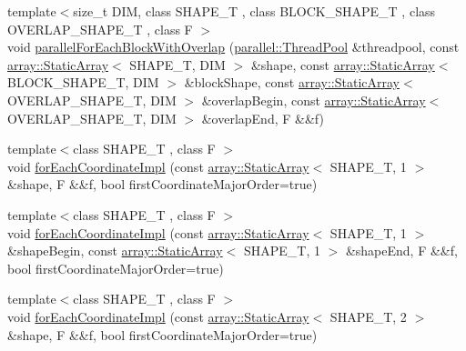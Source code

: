 \begin{DoxyCompactItemize}
\item 
{\footnotesize template$<$size\+\_\+t D\+I\+M, class S\+H\+A\+P\+E\+\_\+\+T , class B\+L\+O\+C\+K\+\_\+\+S\+H\+A\+P\+E\+\_\+\+T , class O\+V\+E\+R\+L\+A\+P\+\_\+\+S\+H\+A\+P\+E\+\_\+\+T , class F $>$ }\\void \hyperlink{namespacenifty_1_1tools_af942eef6747790a4f8d6868b1f95c3ee}{parallel\+For\+Each\+Block\+With\+Overlap} (\hyperlink{classnifty_1_1parallel_1_1ThreadPool}{parallel\+::\+Thread\+Pool} \&threadpool, const \hyperlink{namespacenifty_1_1array_a683f151f19c851754e0c6d55ed16a0c2}{array\+::\+Static\+Array}$<$ S\+H\+A\+P\+E\+\_\+\+T, D\+I\+M $>$ \&shape, const \hyperlink{namespacenifty_1_1array_a683f151f19c851754e0c6d55ed16a0c2}{array\+::\+Static\+Array}$<$ B\+L\+O\+C\+K\+\_\+\+S\+H\+A\+P\+E\+\_\+\+T, D\+I\+M $>$ \&block\+Shape, const \hyperlink{namespacenifty_1_1array_a683f151f19c851754e0c6d55ed16a0c2}{array\+::\+Static\+Array}$<$ O\+V\+E\+R\+L\+A\+P\+\_\+\+S\+H\+A\+P\+E\+\_\+\+T, D\+I\+M $>$ \&overlap\+Begin, const \hyperlink{namespacenifty_1_1array_a683f151f19c851754e0c6d55ed16a0c2}{array\+::\+Static\+Array}$<$ O\+V\+E\+R\+L\+A\+P\+\_\+\+S\+H\+A\+P\+E\+\_\+\+T, D\+I\+M $>$ \&overlap\+End, F \&\&f)
\item 
{\footnotesize template$<$class S\+H\+A\+P\+E\+\_\+\+T , class F $>$ }\\void \hyperlink{namespacenifty_1_1tools_a2f0a7c111de3217482567849aecac6b6}{for\+Each\+Coordinate\+Impl} (const \hyperlink{namespacenifty_1_1array_a683f151f19c851754e0c6d55ed16a0c2}{array\+::\+Static\+Array}$<$ S\+H\+A\+P\+E\+\_\+\+T, 1 $>$ \&shape, F \&\&f, bool first\+Coordinate\+Major\+Order=true)
\item 
{\footnotesize template$<$class S\+H\+A\+P\+E\+\_\+\+T , class F $>$ }\\void \hyperlink{namespacenifty_1_1tools_ade4cdd4e464112baf195beda9d662a96}{for\+Each\+Coordinate\+Impl} (const \hyperlink{namespacenifty_1_1array_a683f151f19c851754e0c6d55ed16a0c2}{array\+::\+Static\+Array}$<$ S\+H\+A\+P\+E\+\_\+\+T, 1 $>$ \&shape\+Begin, const \hyperlink{namespacenifty_1_1array_a683f151f19c851754e0c6d55ed16a0c2}{array\+::\+Static\+Array}$<$ S\+H\+A\+P\+E\+\_\+\+T, 1 $>$ \&shape\+End, F \&\&f, bool first\+Coordinate\+Major\+Order=true)
\item 
{\footnotesize template$<$class S\+H\+A\+P\+E\+\_\+\+T , class F $>$ }\\void \hyperlink{namespacenifty_1_1tools_ad2a256c13ab9dfa6bdd0a1d32ecf49fc}{for\+Each\+Coordinate\+Impl} (const \hyperlink{namespacenifty_1_1array_a683f151f19c851754e0c6d55ed16a0c2}{array\+::\+Static\+Array}$<$ S\+H\+A\+P\+E\+\_\+\+T, 2 $>$ \&shape, F \&\&f, bool first\+Coordinate\+Major\+Order=true)

\end{DoxyCompactItemize}
